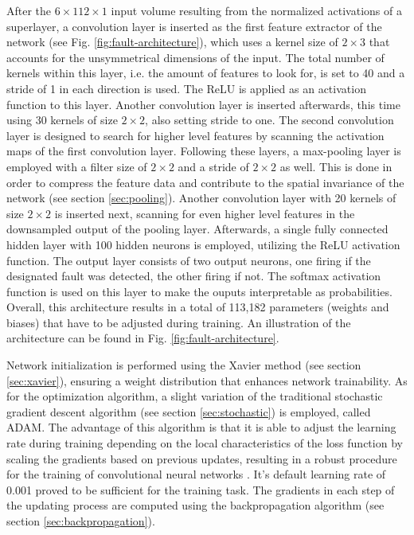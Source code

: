 After the \(6 \times 112 \times 1\) input volume resulting from the
normalized activations of a superlayer, a convolution layer
is inserted as the first feature extractor of the network (see
Fig. \ref{fig:fault-architecture}), which
uses a kernel size of \(2 \times 3\) that accounts for the
unsymmetrical dimensions of the input. The total number of kernels
within this layer, i.e. the amount of features to look for, is set to
40 and a stride of 1 in each direction is used. The ReLU is applied
as an activation function to this layer. Another convolution layer is
inserted afterwards, this time using 30 kernels of size \(2 \times
2\), also setting stride to one. The second convolution layer is
designed to search for higher level features by scanning the
activation maps of the first convolution layer.
Following these layers, a max-pooling layer is
employed with a filter size of \(2 \times 2\) and a stride of \(2
\times 2\) as well. This is done in order to compress the feature data
and contribute to the spatial invariance of the network (see section
\ref{sec:pooling}). Another convolution layer with 20
kernels of size \(2 \times 2\) is inserted next, scanning for even
higher level features in the downsampled output of the pooling
layer. Afterwards, a single fully
connected hidden layer with 100 hidden neurons is employed, utilizing
the ReLU activation function. The output layer consists of two
output neurons, one firing if the designated fault was detected, the
other firing if not. The softmax activation function is used on this
layer to make the ouputs interpretable as probabilities. Overall, this
architecture results in a total of 113,182 parameters (weights and
biases) that have to be adjusted during training. An illustration of
the architecture can be found in Fig. \ref{fig:fault-architecture}.

Network initialization is performed using the Xavier
method (see section \ref{sec:xavier}), ensuring a weight distribution
that enhances network trainability. As for the optimization algorithm,
a slight variation of the traditional stochastic gradient
descent algorithm (see section \ref{sec:stochastic}) is employed,
called ADAM. The advantage of this algorithm is that it is able to
adjust the learning rate during training depending on the local
characteristics of the loss function by scaling the gradients based on
previous updates, resulting in a robust procedure for the training of
convolutional neural networks \cite{adam}. It's default learning rate
of 0.001 proved to be sufficient for the training task. The gradients
in each step of the updating process are computed using the
backpropagation algorithm (see section \ref{sec:backpropagation}).

